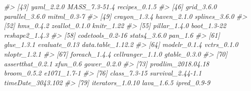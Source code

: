 \documentclass[]{book}
\newenvironment{Shaded}{\begin{snugshade}}{\end{snugshade}}
\newcommand{\CommentTok}[1]{\textcolor[rgb]{0.56,0.35,0.01}{\textit{#1}}}
\begin{document}
\begin{Shaded}
\begin{Highlighting}[]
\CommentTok{#> [43] yaml_2.2.0          MASS_7.3-51.4       recipes_0.1.5      }
\CommentTok{#> [46] grid_3.6.0          parallel_3.6.0      mitml_0.3-7        }
\CommentTok{#> [49] crayon_1.3.4        haven_2.1.0         splines_3.6.0      }
\CommentTok{#> [52] hms_0.4.2           zeallot_0.1.0       knitr_1.22         }
\CommentTok{#> [55] pillar_1.4.0        boot_1.3-22         reshape2_1.4.3     }
\CommentTok{#> [58] codetools_0.2-16    stats4_3.6.0        pan_1.6            }
\CommentTok{#> [61] glue_1.3.1          evaluate_0.13       data.table_1.12.2  }
\CommentTok{#> [64] modelr_0.1.4        vctrs_0.1.0         nloptr_1.2.1       }
\CommentTok{#> [67] foreach_1.4.4       cellranger_1.1.0    gtable_0.3.0       }
\CommentTok{#> [70] assertthat_0.2.1    xfun_0.6            gower_0.2.0        }
\CommentTok{#> [73] prodlim_2018.04.18  broom_0.5.2         e1071_1.7-1        }
\CommentTok{#> [76] class_7.3-15        survival_2.44-1.1   timeDate_3043.102  }
\CommentTok{#> [79] iterators_1.0.10    lava_1.6.5          ipred_0.9-9}
\end{Highlighting}
\end{Shaded}


\end{document}
